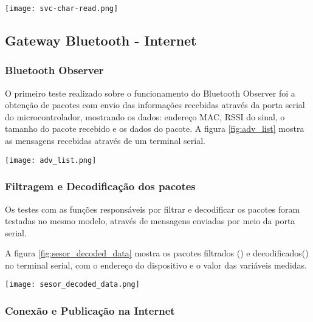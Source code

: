 \begin{center}
	\centering 
	\texttt{[image: svc-char-read.png]}
	\label{fig:svc-char-read}
\end{center} 

\subsection{Gateway Bluetooth - Internet}

\subsubsection{Bluetooth Observer}
 
O primeiro teste realizado sobre o funcionamento do Bluetooth Observer foi a
obtenção de pacotes com envio das informações recebidas através da porta serial
do microcontrolador, mostrando os dados: endereço MAC, RSSI do sinal, o tamanho
do pacote recebido e os dados do pacote. A figura \ref{fig:adv_list} mostra as
mensagens recebidas através de um terminal serial.

\begin{center}
	\centering 
	\texttt{[image: adv\_list.png]}
	\label{fig:adv_list}
\end{center} 

\subsubsection{Filtragem e Decodificação dos pacotes}
Os testes com as funções responsáveis por filtrar e decodificar os pacotes foram
testadas no mesmo modelo, através de mensagens enviadas por meio da porta
serial.

A figura \ref{fig:sesor_decoded_data} mostra os pacotes filtrados
() e decodificados() no
terminal serial, com o endereço do dispositivo e o valor das variáveis medidas.

\begin{center}
	\centering 
	\texttt{[image: sesor\_decoded\_data.png]}
	\label{fig:sesor_decoded_data}
\end{center} 

\subsubsection{Conexão e Publicação na Internet}

